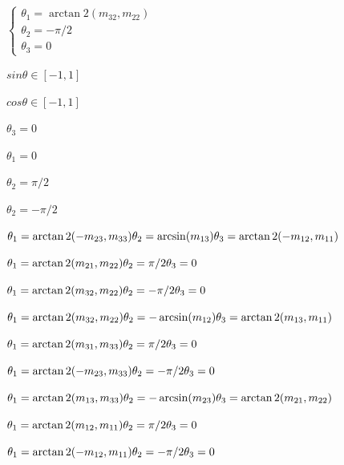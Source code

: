 \documentclass{article}
\begin{document}
$ \begin{cases}\theta_1=\arctan2(m_{32},m_{22}) \\ \theta_2=-\pi/2\\  \theta_3=0\end{cases}$
\pagebreak

$ sin \theta\in [-1,1] $
\pagebreak

$ cos \theta \in [-1,1] $
\pagebreak

$\theta_3 = 0$
\pagebreak

$\theta_1 = 0$
\pagebreak

$\theta_2 = π/2$
\pagebreak

$\theta_2 = -π/2$
\pagebreak

$ \theta_1 = \arctan2(-m_{23},m_{33})\\\theta_2 = \arcsin(m_{13}) \\\theta_3= \arctan2(-m_{12},m_{11}) $
\pagebreak

$ \theta_1=\arctan2(m_{21},m_{22})\\ \theta_2=\pi/2\\ \theta_3=0 $
\pagebreak

$ \theta_1=\arctan2(m_{32},m_{22})\\ \theta_2=-\pi/2\\ \theta_3=0 $
\pagebreak

$ \theta_1 = \arctan2(m_{32},m_{22})\\\theta_2 = -\arcsin(m_{12}) \\\theta_3= \arctan2(m_{13},m_{11}) $
\pagebreak

$ \theta_1=\arctan2(m_{31},m_{33})\\ \theta_2=\pi/2\\ \theta_3=0 $
\pagebreak

$ \theta_1=\arctan2(-m_{23},m_{33})\\ \theta_2=-\pi/2\\ \theta_3=0 $
\pagebreak

$ \theta_1 = \arctan2(m_{13},m_{33})\\\theta_2 = -\arcsin(m_{23}) \\\theta_3= \arctan2(m_{21},m_{22}) $
\pagebreak

$ \theta_1=\arctan2(m_{12},m_{11})\\ \theta_2=\pi/2\\ \theta_3=0 $
\pagebreak

$ \theta_1=\arctan2(-m_{12},m_{11})\\ \theta_2=-\pi/2\\ \theta_3=0 $
\pagebreak
\end{document}
